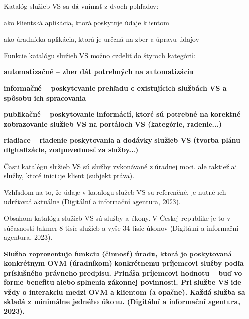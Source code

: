 \blank
Katalóg služieb VS sa dá vnímať z dvoch pohľadov:

\startitemize[a]
\item{ako klientská aplikácia, ktorá poskytuje údaje klientom}
\item{ako úradnícka aplikácia, ktorá je určená na zber a úpravu údajov}
\stopitemize

Funkcie katalógu služieb VS možno ozdeliť do štyroch kategórií:

\startitemize
\item{\start \bf automatizačné \stop – zber dát potrebných na automatizáciu}
\item{\start \bf informačné \stop – poskytovanie prehľadu o existujícich službách VS a spôsobu ich spracovania}
\item{\start \bf publikačné \stop – poskytovanie informácií, ktoré sú potrebné na korektné zobrazovanie služieb VS na portáloch VS (kategórie, radenie...)}
\item{\start \bf riadiace \stop – riadenie poskytovania a dodávky služieb VS (tvorba plánu digitalizácie, zodpovednosť za služby...)}
\stopitemize

Časti katalógu služieb VS sú služby vykonávané z úradnej moci, ale taktiež aj služby, ktoré iniciuje klient (subjekt práva). 


%

Vzhľadom na to, že údaje v katalogu služeb VS sú referenčné, je nutné ich udržiavať aktuálne \scr(Digitální a informační agentura, 2023).

Obsahom katalógu služieb VS sú služby a úkony. V Českej republike je to v súčasnosti takmer 8 tisíc služieb a vyše 34 tisíc úkonov \scr(Digitální a informační agentura, 2023).

\start\bf Služba \stop reprezentuje funkciu (činnosť) úradu, ktorá je poskytovaná konkrétnym OVM (úradníkom) konkrétnemu príjemcovi služby podľa príslušného právneho predpisu. Prináša príjemcovi hodnotu -- buď vo forme benefitu alebo splnenia zákonnej povinnosti. Pri službe VS ide vždy o interakciu medzi OVM a klientom (a opačne). Každá služba sa skladá z minimálne jedného úkonu. \scr(Digitální a informační agentura, 2023).

